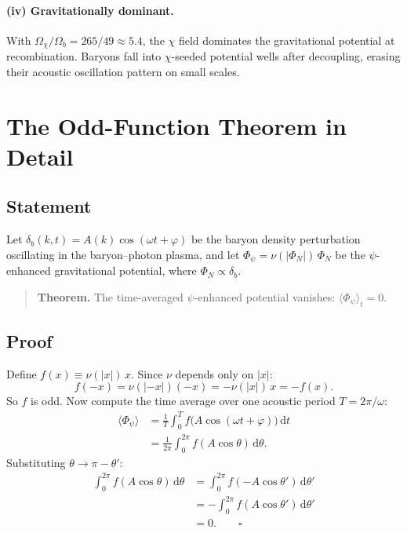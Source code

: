 \documentclass[12pt,a4paper]{article}
\begin{document}
\paragraph{(iv) Gravitationally dominant.}
With $\Omega_\chi/\Omega_b = 265/49 \approx 5.4$, the $\chi$ field
dominates the gravitational potential at recombination. Baryons fall
into $\chi$-seeded potential wells after decoupling, erasing their
acoustic oscillation pattern on small scales.

\section{The Odd-Function Theorem in Detail}
\label{sec:odd_detail}

\subsection{Statement}

Let $\delta_b(k,t) = A(k)\cos(\omega t + \varphi)$ be the baryon
density perturbation oscillating in the baryon--photon plasma, and let
$\Phi_\psi = \nu(|\Phi_N|)\,\Phi_N$ be the $\psi$-enhanced
gravitational potential, where $\Phi_N \propto \delta_b$.

\begin{quote}
\textbf{Theorem.} The time-averaged $\psi$-enhanced potential vanishes:
$\langle\Phi_\psi\rangle_t = 0$.
\end{quote}

\subsection{Proof}

Define $f(x) \equiv \nu(|x|)\,x$. Since $\nu$ depends only on $|x|$:
\begin{equation}
  f(-x) = \nu(|-x|)(-x) = -\nu(|x|)\,x = -f(x).
\end{equation}
So $f$ is odd. Now compute the time average over one acoustic period
$T = 2\pi/\omega$:
\begin{align}
  \langle\Phi_\psi\rangle
  &= \frac{1}{T}\int_0^T f\!\bigl(A\cos(\omega t + \varphi)\bigr)\,\mathrm{d}t
  \nonumber\\[4pt]
  &= \frac{1}{2\pi}\int_0^{2\pi} f(A\cos\theta)\,\mathrm{d}\theta.
  \label{eq:time_avg}
\end{align}
Substituting $\theta \to \pi - \theta'$:
\begin{align}
  \int_0^{2\pi} f(A\cos\theta)\,\mathrm{d}\theta
  &= \int_0^{2\pi} f(-A\cos\theta')\,\mathrm{d}\theta'
  \nonumber\\[2pt]
  &= -\int_0^{2\pi} f(A\cos\theta')\,\mathrm{d}\theta'
  \nonumber\\[2pt]
  &= 0. \qquad\square
\end{align}
\end{document}

